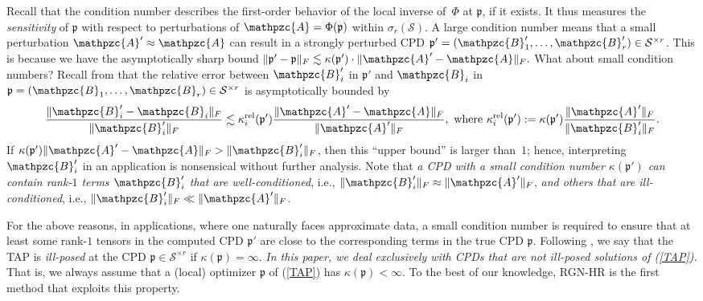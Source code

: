 \documentclass[a4paper,10pt,final]{siamart1116}
\newcommand{\tuple}[1]{\mathfrak{#1}}
\newcommand{\Var}[1]{\mathcal{#1}}
\newcommand{\tensor}[1]{\mathpzc{#1}}
\newcommand{\refeqn}[1]{{(\ref{#1})}}
\numberwithin{equation}{section}
\numberwithin{figure}{section}
\numberwithin{table}{section}
\numberwithin{theorem}{section}
\begin{document}
Recall that the condition number describes the first-order behavior of the local inverse of~$\Phi$ at $\tuple{p}$, if it exists. It thus measures the \emph{sensitivity} of $\tuple{p}$ with respect to perturbations of $\tensor{A}=\Phi(\tuple{p})$ within $\sigma_r(\Var S)$.
A large condition number means that a small perturbation $\tensor{A}' \approx \tensor{A}$ can result in a {strongly perturbed} CPD $\tuple{p}' = (\tensor{B}_1',\ldots,\tensor{B}_r') \in \Var{S}^{\times r}$. This is because we have the asymptotically sharp bound
\(
\| \tuple{p}' - \tuple{p}\|_{F} \lesssim \kappa(\tuple{p}') \cdot \| \tensor{A}' - \tensor{A} \|_F.
\)
What about small condition numbers? Recall from \cite{BV2017} that the relative error between $\tensor{B}_i'$ in $\tuple{p}'$ and $\tensor{B}_i$ in $\tuple{p} = (\tensor{B}_1,\ldots,\tensor{B}_r) \in \Var{S}^{\times r}$ is asymptotically bounded by
\begin{equation*} %
 \frac{\|\tensor{B}_i' - \tensor{B}_i\|_F}{\|\tensor{B}_i'\|_F} \lesssim \kappa_i^{\text{rel}}(\tuple{p}') \frac{\|\tensor{A}'-\tensor{A}\|_F}{\|\tensor{A}'\|_F}, \text{ where }
 \kappa_i^{\text{rel}}(\tuple{p}') := \kappa(\tuple{p}') \frac{\|\tensor{A}'\|_F}{\|\tensor{B}_i'\|_F}.
\end{equation*}
If $\kappa(\tuple{p}') \|\tensor{A}'-\tensor{A}\|_F > \|\tensor{B}_i'\|_F$, then this ``upper bound'' is larger than~$1$; hence, interpreting $\tensor{B}_i'$ in an application is nonsensical without further analysis. Note that \emph{a CPD with a small condition number $\kappa(\tuple{p}')$ can contain rank-$1$ terms $\tensor{B}_i'$ that are well-conditioned}, i.e., $\|\tensor{B}_i'\|_F \approx \|\tensor{A}'\|_F$, \emph{and others that are ill-conditioned}, i.e., $\|\tensor{B}_i'\|_F \ll \|\tensor{A}'\|_F$.

For the above reasons, in applications, where one naturally faces approximate data, a small condition number is required {to ensure that at least some rank-$1$ tensors in the computed CPD $\tuple{p}'$ are close to the corresponding terms in the} true CPD $\tuple{p}$.
Following \cite{BV2017}, we say that the TAP is \emph{ill-posed} at the CPD $\tuple{p} \in \Var{S}^{\times r}$ if $\kappa(\tuple{p}) = \infty$.
\emph{In this paper, we deal exclusively with CPDs that are not ill-posed solutions of \refeqn{TAP}.} That is, we always assume that a (local) optimizer $\tuple{p}$ of \refeqn{TAP} has $\kappa(\tuple{p}) < \infty$. To the best of our knowledge, RGN-HR is the first method that exploits this property.
\end{document}
